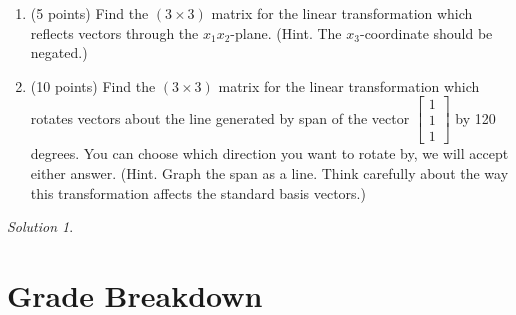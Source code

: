 \documentclass{article}
\theoremstyle{remark}
\newtheorem*{solution}{Solution}
\begin{document}
\begin{enumerate}
\item (5 points) Find the $(3 \times 3)$ matrix for the linear transformation which reflects vectors through the $x_1 x_2$-plane. (Hint. The $x_3$-coordinate should be negated.)
\item (10 points) Find the $(3 \times 3)$ matrix for the linear transformation which rotates vectors about the line generated by span of the vector $\begin{bmatrix}1 \\ 1 \\ 1\end{bmatrix}$ by 120 degrees. You can choose which direction you want to rotate by, we will accept either answer. (Hint. Graph the span as a line. Think carefully about the way this transformation affects the standard basis vectors.)
\end{enumerate}

\medskip

\begin{solution}
\end{solution}

\pagebreak
\section{Grade Breakdown}
\end{document}
